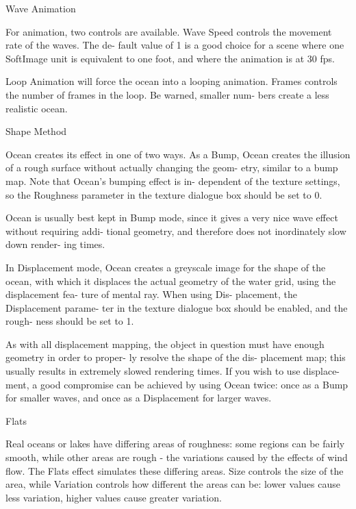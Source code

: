        Wave Animation

       For animation, two controls are
       available. Wave Speed controls the
       movement rate of the waves. The de-
       fault value of 1 is a good choice
       for a scene where one SoftImage
       unit is equivalent to one foot, and
       where the animation is at 30 fps.

       Loop Animation will force the ocean
       into a looping animation. Frames
       controls the number of frames in
       the loop. Be warned, smaller num-
       bers create a less realistic ocean.



       Shape Method

       Ocean creates its effect in one of
       two ways. As a Bump, Ocean creates
       the illusion of a rough surface
       without actually changing the geom-
       etry, similar to a bump map. Note
       that Ocean's bumping effect is in-
       dependent of the texture settings,
       so the Roughness parameter in the
       texture dialogue box should be set
       to 0.

       Ocean is usually best kept in Bump
       mode, since it gives a very nice
       wave effect without requiring addi-
       tional geometry, and therefore does
       not inordinately slow down render-
       ing times.

       In Displacement mode, Ocean creates
       a greyscale image for the shape of
       the ocean, with which it displaces
       the actual geometry of the water
       grid, using the displacement fea-
       ture of mental ray. When using Dis-
       placement, the Displacement parame-
       ter in the texture dialogue box
       should be enabled, and the rough-
       ness should be set to 1.

       As with all displacement mapping,
       the object in question must have
       enough geometry in order to proper-
       ly resolve the shape of the dis-
       placement map; this usually results
       in extremely slowed rendering
       times. If you wish to use displace-
       ment, a good compromise can be
       achieved by using Ocean twice: once
       as a Bump for smaller waves, and
       once as a Displacement for larger
       waves.



       Flats

       Real oceans or lakes have differing
       areas of roughness: some regions
       can be fairly smooth, while other
       areas are rough - the variations
       caused by the effects of wind flow.
       The Flats effect simulates these
       differing areas. Size controls the
       size of the area, while Variation
       controls how different the areas
       can be: lower values cause less
       variation, higher values cause
       greater variation.

